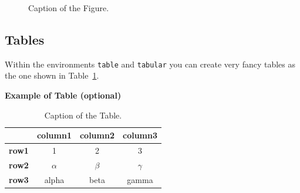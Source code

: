 \documentclass[11pt,a4paper]{article}
\begin{document}
\begin{figure}[H]
    \centering
    \quad
    \caption[]{Caption of the Figure.}
    \label{fig:quadtree2}
\end{figure}

\subsection{Tables}
\label{subsec:tables}

Within the environments \texttt{table} and  \texttt{tabular} you can create very fancy tables as the one shown in Table~\ref{table:example}.

\begin{table}[H]
    \caption*{\textbf{Example of Table (optional)}}
    \centering
    \begin{tabular}{|p{3em} c c c |}
        \hline
        \rowcolor{bluePoli!40}
                      & \textbf{column1} & \textbf{column2} & \textbf{column3} \T\B \\
        \hline \hline
        \textbf{row1} & 1                & 2                & 3 \T\B                \\
        \textbf{row2} & $\alpha$         & $\beta$          & $\gamma$ \T\B         \\
        \textbf{row3} & alpha            & beta             & gamma \B              \\
        \hline
    \end{tabular}
    \\[10pt]
    \caption{Caption of the Table.}
    \label{table:example}
\end{table}
\end{document}
